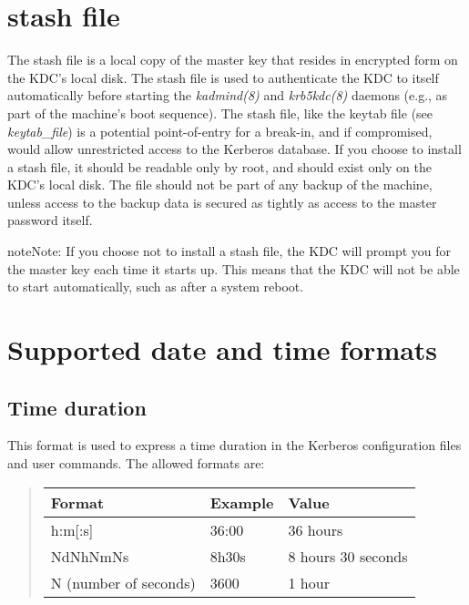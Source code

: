 \documentclass[letterpaper,10pt,english]{sphinxmanual}
\begin{document}
\chapter{stash file}
\label{basic/stash_file_def:stash-file}\label{basic/stash_file_def::doc}\label{basic/stash_file_def:stash-definition}
The stash file is a local copy of the master key that resides in
encrypted form on the KDC's local disk.  The stash file is used to
authenticate the KDC to itself automatically before starting the
\emph{kadmind(8)} and \emph{krb5kdc(8)} daemons (e.g., as part of the
machine's boot sequence).  The stash file, like the keytab file (see
\emph{keytab\_file}) is a potential point-of-entry for a break-in, and
if compromised, would allow unrestricted access to the Kerberos
database.  If you choose to install a stash file, it should be
readable only by root, and should exist only on the KDC's local disk.
The file should not be part of any backup of the machine, unless
access to the backup data is secured as tightly as access to the
master password itself.

\begin{notice}{note}{Note:}
If you choose not to install a stash file, the KDC will prompt you for the master key each time it starts up.
This means that the KDC will not be able to start automatically, such as after a system reboot.
\end{notice}


\chapter{Supported date and time formats}
\label{basic/date_format:supported-date-and-time-formats}\label{basic/date_format::doc}\label{basic/date_format:datetime}

\section{Time duration}
\label{basic/date_format:duration}\label{basic/date_format:time-duration}
This format is used to express a time duration in the Kerberos
configuration files and user commands.  The allowed formats are:
\begin{quote}

\begin{tabulary}{\linewidth}{|L|L|L|}
\hline

Format
 & 
Example
 & 
Value
\\
\hline
h:m{[}:s{]}
 & 
36:00
 & 
36 hours
\\
\hline
NdNhNmNs
 & 
8h30s
 & 
8 hours 30 seconds
\\
\hline
N (number of seconds)
 & 
3600
 & 
1 hour
\\
\hline\end{tabulary}

\end{quote}
\end{document}
